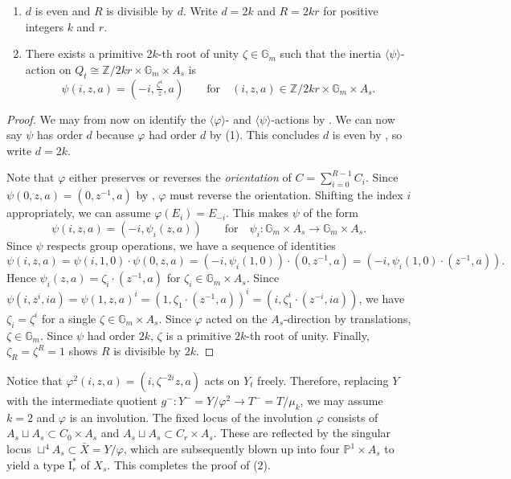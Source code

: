 \documentclass[reqno, letterpaper]{amsart}
\numberwithin{equation}{subsection}
\let\to\longrightarrow
\newcommand{\GG}{\mathbb{G}}
\newcommand{\PP}{\mathbb{P}}
\newcommand{\ZZ}{\mathbb{Z}}
\begin{document}
			\begin{corollary} \label{cor:semistable reduction theorem:psi-action}
				\begin{enumerate}
					\item $d$ is even and $R$ is divisible by $d$. Write $d = 2k$ and $R = 2kr$ for positive integers $k$ and $r$.
					\item There exists a primitive $2k$-th root of unity $\zeta \in \GG_m$ such that the inertia $\langle \psi \rangle$-action on $Q_t \cong \ZZ/2kr \times \GG_m \times A_s$ is
					\[ \psi(i,z,a) = (-i,\tfrac{\zeta^i}{z}, a) \qquad\mbox{for}\quad (i,z,a) \in \ZZ/2kr \times \GG_m \times A_s .\]
				\end{enumerate}
			\end{corollary}
			\begin{proof}
				We may from now on identify the $\langle \varphi \rangle$- and $\langle \psi \rangle$-actions by . We can now say $\psi$ has order $d$ because $\varphi$ had order $d$ by (1). This concludes $d$ is even by , so write $d = 2k$.
				
				Note that $\varphi$ either preserves or reverses the \emph{orientation} of $C = \sum_{i=0}^{R-1} C_i$. Since $\psi(0,z,a) = (0,z^{-1},a)$ by , $\varphi$ must reverse the orientation. Shifting the index $i$  appropriately, we can assume $\varphi(E_i) = E_{-i}$. This makes $\psi$ of the form
				\[ \psi(i,z,a) = (-i, \psi_i (z,a)) \qquad\mbox{for}\quad \psi_i : \GG_m \times A_s \to \GG_m \times A_s. \]
				Since $\psi$ respects group operations, we have a sequence of identities
				\[ \psi(i,z,a) = \psi(i,1,0) \cdot \psi(0,z,a) = (-i, \psi_i(1,0)) \cdot (0,z^{-1},a) = (-i, \psi_i(1,0) \cdot (z^{-1},a)) .\]
				Hence $\psi_i(z,a) = \zeta_i \cdot (z^{-1},a)$ for $\zeta_i \in \GG_m \times A_s$. Since $\psi(i,z^i, ia) = \psi(1,z,a)^i = (1,\zeta_1 \cdot (z^{-1},a))^i = (i, \zeta_1^i \cdot (z^{-i}, ia))$, we have $\zeta_i = \zeta^i$ for a single $\zeta \in \GG_m \times A_s$. Since $\varphi$ acted on the $A_s$-direction by translations, $\zeta \in \GG_m$. Since $\psi$ had order $2k$, $\zeta$ is a primitive $2k$-th root of unity. Finally, $\zeta_R = \zeta^R = 1$ shows $R$ is divisible by $2k$.
			\end{proof}
			
			Notice that $\varphi^2(i,z,a) = (i, \zeta^{-2i}z,a)$ acts on $Y_t$ freely. Therefore, replacing $Y$ with the intermediate quotient $g^- : Y^- = Y / \varphi^2 \to T^- = T/\mu_k$, we may assume $k = 2$ and $\varphi$ is an involution. The fixed locus of the involution $\varphi$ consists of $A_s \sqcup A_s \subset C_0 \times A_s$ and $A_s \sqcup A_s \subset C_r \times A_s$. These are reflected by the singular locus $\sqcup^4 A_s \subset \bar X = Y/\varphi$, which are subsequently blown up into four $\PP^1 \times A_s$ to yield a type $\mathrm I_r^*$ of $X_s$. This completes the proof of (2).
			
\end{document}
